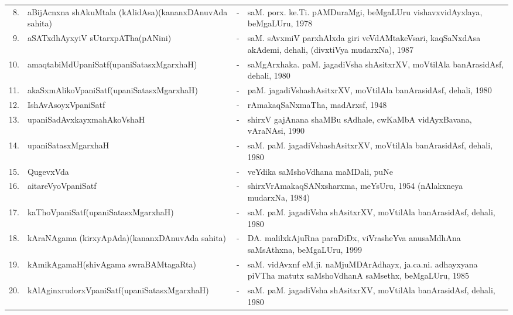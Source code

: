 {\begin{longtable}{rp{6cm}cp{9cm}<{\raggedright}@{}}
8. & aBijAcnxna shAkuMtala (kAlidAsa)\newline (kananxDAnuvAda sahita) &-& saM. porx. ke.Ti. pAMDuraMgi, beMgaLUru vishavxvidAyxlaya, beMgaLUru, 1978\\
9. & aSATxdhAyxyiV sUtarxpATha\newline (pANini) &-& saM. sAvxmiV parxhAlxda giri veVdAMtakeVsari, kaqSaNxdAsa akAdemi, dehali, (divxtiVya mudarxNa), 1987\\
10. & amaqtabiMdUpaniSatf\newline (upaniSatasxMgarxhaH) &-& saMgArxhaka. paM. jagadiVsha shAsitxrXV, moVtilAla banArasidAsf, dehali, 1980\\
11. & akaSxmAlikoVpaniSatf\newline (upaniSatasxMgarxhaH) &-& paM. jagadiVshashAsitxrXV, moVtilAla banArasidAsf, dehali, 1980\\
12. & IshAvAsoyxVpaniSatf &-& rAmakaqSaNxmaTha, madArxsf, 1948\\
13. & upaniSadAvxkayxmahAkoVshaH &-& shirxV gajAnana shaMBu sAdhale, cwKaMbA vidAyxBavana, vAraNAsi, 1990\\
14. & upaniSatasxMgarxhaH &-& saM. paM. jagadiVshashAsitxrXV, moVtilAla banArasidAsf, dehali, 1980\\
15. & QugevxVda &-& veYdika saMshoVdhana maMDali, puNe\\
16. & aitareVyoVpaniSatf &-& shirxVrAmakaqSANxsharxma, meYsUru, 1954 (nAlakxneya mudarxNa, 1984)\\
17. & kaThoVpaniSatf\newline (upaniSatasxMgarxhaH) &-& saM. paM. jagadiVsha shAsitxrXV, moVtilAla banArasidAsf, dehali, 1980\\
18. & kAraNAgama (kirxyApAda)\newline (kananxDAnuvAda sahita) &-& DA. malilxkAjuRna paraDiDx, viVrasheYva anusaMdhAna saMsAthxna, beMgaLUru, 1999\\
19. & kAmikAgamaH\newline (shivAgama swraBAMtagaRta) &-& saM. vidAvxnf eM.ji. naMjuMDArAdhayx, ja.ca.ni. adhayxyana piVTha matutx saMshoVdhanA saMsethx, beMgaLUru, 1985\\
20. & kAlAginxrudorxVpaniSatf\newline (upaniSatasxMgarxhaH) &-& saM. paM. jagadiVsha shAsitxrXV, moVtilAla banArasidAsf, dehali, 1980\\

\end{longtable}}
